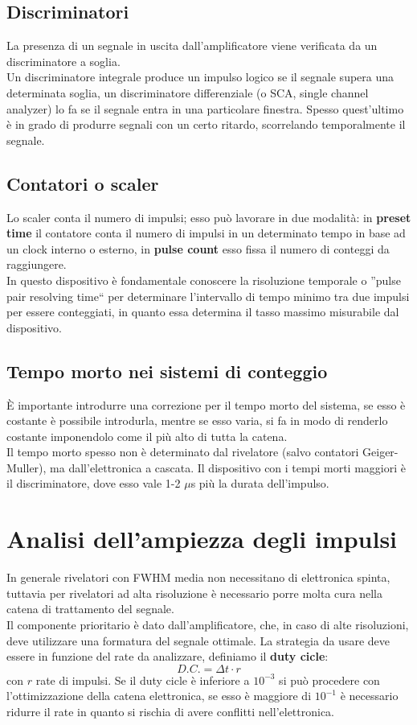 \subsection{Discriminatori}
La presenza di un segnale in uscita dall'amplificatore viene verificata da un discriminatore a soglia.\\
Un discriminatore integrale produce un impulso logico se il segnale supera una determinata soglia, un discriminatore differenziale (o SCA, single channel analyzer) lo fa se il segnale entra
in una particolare finestra.
Spesso quest'ultimo \`e in grado di produrre segnali con un certo ritardo, scorrelando temporalmente il segnale.
\subsection{Contatori o scaler}
Lo scaler conta il numero di impulsi; esso pu\`o lavorare in due modalit\`a: in \textbf{preset time} il contatore conta il numero di impulsi in un determinato tempo
in base ad un clock interno o esterno, in \textbf{pulse count} esso fissa il numero di conteggi da raggiungere.\\
In questo dispositivo \`e fondamentale conoscere la risoluzione temporale o ''pulse pair resolving time`` per determinare l'intervallo di tempo
minimo tra due impulsi per essere conteggiati, in quanto essa determina il tasso massimo misurabile dal dispositivo.
\subsection{Tempo morto nei sistemi di conteggio}
\`E importante introdurre una correzione per il tempo morto del sistema, se esso \`e costante \`e possibile introdurla, mentre se esso varia, si fa in modo
di renderlo costante imponendolo come il pi\`u alto di tutta la catena.\\
Il tempo morto spesso non \`e determinato dal rivelatore (salvo contatori Geiger-Muller), ma dall'elettronica a cascata.
Il dispositivo con i tempi morti maggiori \`e il discriminatore, dove esso vale 1-2 $\mu$s pi\`u la durata dell'impulso.
\section{Analisi dell'ampiezza degli impulsi}
In generale rivelatori con FWHM media non necessitano di elettronica spinta, tuttavia per rivelatori ad alta risoluzione \`e necessario porre molta cura nella catena
di trattamento del segnale.\\
Il componente prioritario \`e dato dall'amplificatore, che, in caso di alte risoluzioni, deve utilizzare una formatura del segnale ottimale.
La strategia da usare deve essere in funzione del rate da analizzare, definiamo il \textbf{duty cicle}:
\begin{equation*}
D.C. = \Delta t \cdot r
\end{equation*}
con $r$ rate di impulsi.
Se il duty cicle \`e inferiore a $10^{-3}$ si pu\`o procedere con l'ottimizzazione della catena elettronica, se esso \`e maggiore di $10^{-1}$ \`e necessario
ridurre il rate in quanto si rischia di avere conflitti nell'elettronica.
